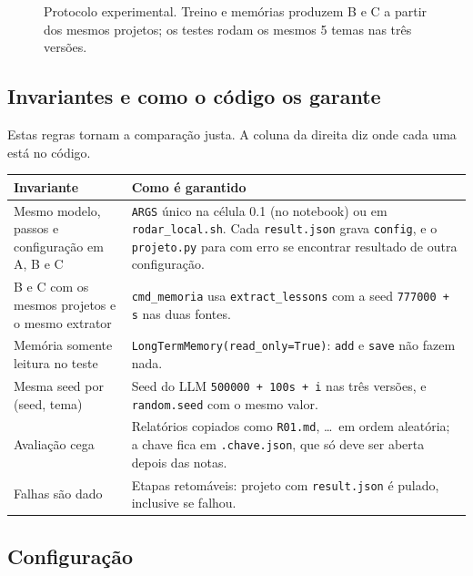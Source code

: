 \documentclass[11pt,a4paper]{article}
\begin{document}
\begin{figure}[H]
\caption{Protocolo experimental. Treino e memórias produzem B e C a partir dos mesmos projetos;
os testes rodam os mesmos 5 temas nas três versões.}
\label{fig:protocolo}
\end{figure}

\subsection{Invariantes e como o código os garante}

Estas regras tornam a comparação justa. A coluna da direita diz onde cada uma está no código.

\begin{center}
\small
\begin{tabularx}{\textwidth}{>{\raggedright\arraybackslash}X >{\raggedright\arraybackslash}X}
\toprule
Invariante & Como é garantido \\
\midrule
Mesmo modelo, passos e configuração em A, B e C &
  \texttt{ARGS} único na célula 0.1 (no notebook) ou em \texttt{rodar\_local.sh}. Cada \texttt{result.json} grava \texttt{config}, e o
  \texttt{projeto.py} para com erro se encontrar resultado de outra configuração. \\
B e C com os mesmos projetos e o mesmo extrator &
  \texttt{cmd\_memoria} usa \texttt{extract\_lessons} com a seed \texttt{777000 + s} nas duas fontes. \\
Memória somente leitura no teste &
  \texttt{LongTermMemory(read\_only=True)}: \texttt{add} e \texttt{save} não fazem nada. \\
Mesma seed por (seed, tema) &
  Seed do LLM \texttt{500000 + 100s + i} nas três versões, e \texttt{random.seed} com o mesmo valor. \\
Avaliação cega &
  Relatórios copiados como \texttt{R01.md}, \ldots\ em ordem aleatória; a chave fica em
  \texttt{.chave.json}, que só deve ser aberta depois das notas. \\
Falhas são dado &
  Etapas retomáveis: projeto com \texttt{result.json} é pulado, inclusive se falhou. \\
\bottomrule
\end{tabularx}
\end{center}

\subsection{Configuração}
\label{sec:config}
\end{document}
